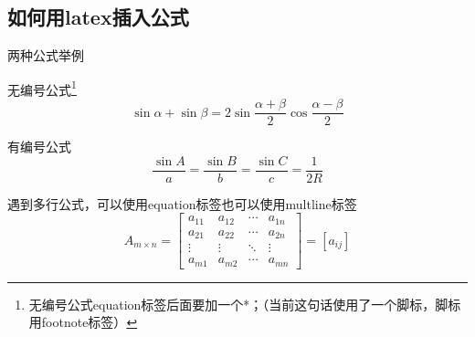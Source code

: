 \documentclass{beamer}
\begin{document}
\subsection{如何用latex插入公式}
\begin{frame}{两种公式举例}

    \begin{exampleblock}{无编号公式\footnote{无编号公式equation标签后面要加一个*；（当前这句话使用了一个脚标，脚标用footnote标签）}} %
        \begin{equation*}
            \sin \alpha + \sin \beta =2 \sin \frac{\alpha + \beta}{2}\cos \frac{\alpha - \beta}{2}
        \end{equation*}
    \end{exampleblock}
    
    \begin{exampleblock}{有编号公式} %
        \begin{equation}
           \frac{\sin A}{a}=\frac{\sin B}{b}=\frac{\sin C}{c}=\frac{1}{2R}        \end{equation}
    \end{exampleblock}
\end{frame}


\begin{frame}
    \begin{exampleblock}{遇到多行公式，可以使用equation标签也可以使用multline标签}
        \begin{equation*}
            A_{m\times n}= \begin{bmatrix} a_{11}& a_{12}& \cdots & a_{1n} \\ a_{21}& a_{22}& \cdots & a_{2n} \\ \vdots & \vdots & \ddots & \vdots \\ a_{m1}& a_{m2}& \cdots & a_{mn} \end{bmatrix} =\left [ a_{ij}\right ]
        \end{equation*}
    \end{exampleblock}
\end{frame}
\end{document}
